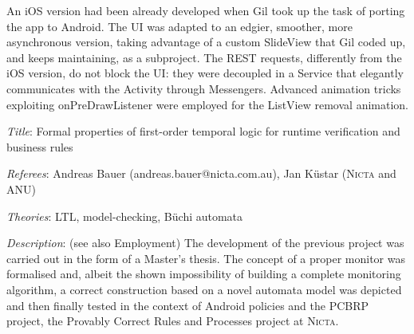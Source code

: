 \documentclass[letterpaper]{article}
\renewenvironment{itemize}{
  \begin{list}{}{
    \setlength{\leftmargin}{1.5em}
  }
}{
  \end{list}
}
\newenvironment{itemize1}{
  \begin{list}{}{
    \setlength{\leftmargin}{0em}
  }
}{
  \end{list}
}
\begin{document}
\begin{itemize1}
\begin{itemize}
An iOS version had been already developed when Gil took up the task of porting the app to Android. The UI was adapted to an edgier, smoother, more asynchronous version, taking advantage of a custom SlideView that Gil coded up, and keeps maintaining, as a subproject. The REST requests, differently from the iOS version, do not block the UI: they were decoupled in a Service that elegantly communicates with the Activity through Messengers. Advanced animation tricks exploiting onPreDrawListener were employed for the ListView removal animation.
\end{itemize}

\bigskip

\item
\begin{itemize}
\item {\it Title}: Formal properties of first-order temporal logic for runtime verification and business rules 
\item {\it Referees}: Andreas Bauer (andreas.bauer@nicta.com.au), Jan K\"{u}star (\textsc{Nicta} and ANU)
\item {\it Theories}: LTL, model-checking, B\"uchi automata
\item {\it Description}: (see also Employment) The development of the previous project was carried out in the form of a Master's thesis. The concept of a proper monitor was formalised and, albeit the shown impossibility of building a complete monitoring algorithm, a correct construction based on a novel automata model was depicted and then finally tested in the context of Android policies and the PCBRP project, the Provably Correct Rules and Processes project at \textsc{Nicta}.
\end{itemize}


\end{itemize1}
\end{document}
